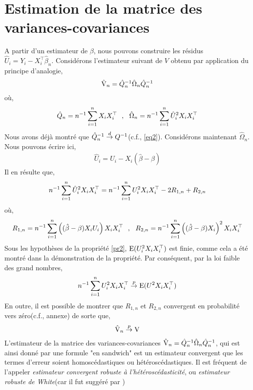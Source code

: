 \section{Estimation de la matrice des variances-covariances}
A partir d'un estimateur de $\beta$, nous pouvons construire les résidus $\hat{U}_i = Y_i - X_i^\top \hat{\beta}_n$.  Considérons l'estimateur suivant de $V$ obtenu par application du principe d'analogie,
\begin{align*}
\hat{\operatorname{V}}_n = \hat{Q}_n^{-1} \hat{\Omega}_n \hat{Q}_n^{-1}
\end{align*}
où,
\begin{align*}
\hat{Q}_n = n^{-1}\sum_{i=1}^n X_iX_i^\top \ \ , \ \ \hat{\Omega}_n = n^{-1}\sum_{i=1}^n \hat{U}_i^2 X_iX_i^\top
\end{align*}
Nous avons déjà montré que $\hat{Q}_n ^{-1} \overset{d}{\rightarrow} Q^{-1}$(c.f., \eqref{eq2}). Considérons maintenant $\hat{\Omega}_n$. Nous pouvons écrire ici,
\begin{align*}
 \hat{U}_i  = U_i - X_i(\hat{\beta}- \beta)
\end{align*}
Il en résulte que,
\begin{align}
n^{-1}\sum_{i=1}^n \hat{U}_i^2 X_iX_i^\top = n^{-1} \sum_{i=1}^n U_i^2X_iX_i^\top - 2R_{1,n} + R_{2,n}
\label{eq5}
\end{align}
où,
\begin{align*}
R_{1,n} = n^{-1} \sumobs \left((\hat{\beta}- \beta)X_iU_i\right)X_iX_i^\top \ \  , \ \ 
R_{2,n} = n^{-1} \sumobs \left((\hat{\beta}- \beta)X_i\right)^2X_iX_i^\top
\end{align*}
Sous les hypothèses de la propriété \ref{pr2}, $\operatorname{E}(U_i^2X_iX_i^\top)$ est finie, comme cela a été montré dans la démonstration de la propriété. Par conséquent, par la loi faible des grand nombres,
\begin{align*}
n^{-1} \sum_{i=1}^n U_i^2 X_iX_i^\top \overset{p}{\rightarrow} \operatorname{E}(U^2X_iX_i^\top)
\end{align*}
En outre, il est possible de montrer que $R_{1,n}$ et $R_{2,n}$ convergent en probabilité vers zéro(c.f., annexe) de sorte que,
\begin{align*}
\hat{\operatorname{V}}_n \overset{p}{\rightarrow} \operatorname{V}
\end{align*}
L'estimateur de la matrice des variances-covariances $\hat{\operatorname{V}}_n = \hat{Q}_n^{-1} \hat{\Omega}_n  \hat{Q}_n^{-1}$, qui est ainsi donné par une formule "en sandwich" est un estimateur convergent que les termes d'erreur soient homoscédastiques ou hétéroscédastiques. Il est fréquent de l'appeler \emph{estimateur convergent robuste à l'hétéroscédasticité}, ou \emph{estimateur robuste de White}(car il fut suggéré par \citep{white1980})

